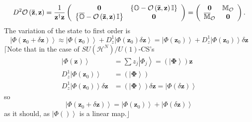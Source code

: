 \documentclass[aps,preprint]{revtex4}%
\begin{document}
\begin{equation}
D^{2}\mathcal{O}\left(  \mathbf{\bar{z},z}\right)  =\frac{1}{\mathbf{z}%
^{\dagger}\mathbf{z}}\left(
\begin{array}
[c]{cc}%
\mathbf{0} & \left\{  \mathbb{O}-\mathcal{O}\left(  \mathbf{\bar{z},z}\right)
\mathbb{I}\right\} \\
\left\{  \overline{\mathbb{O}}-\mathcal{O}\left(  \mathbf{\bar{z},z}\right)
\mathbb{I}\right\}  & \mathbf{0}%
\end{array}
\right)  =\left(
\begin{array}
[c]{cc}%
\mathbf{0} & \mathbb{M}_{\mathcal{O}}\\
\overline{\mathbb{M}}_{\mathcal{O}} & \mathbf{0}%
\end{array}
\right)  .
\end{equation}
The variation of the state to first order is
\begin{equation}
\left\vert \Phi\left(  \mathbf{z}_{0}+\delta\mathbf{z}\right)  \right\rangle
\approx\left\vert \Phi\left(  \mathbf{z}_{0}\right)  \right\rangle +D_{z}%
^{1}\left\vert \Phi\left(  \mathbf{z}_{0}\right)  \delta\mathbf{z}%
\right\rangle =\left\vert \Phi\left(  \mathbf{z}_{0}\right)  \right\rangle
+D_{z}^{1}\left\vert \Phi\left(  \mathbf{z}_{0}\right)  \right\rangle
\delta\mathbf{z}%
\end{equation}
$\lceil$Note that in the case of $SU\left(  \mathcal{H}^{N}\right)  /U\left(
1\right)  $-CS's
\begin{align}
\left\vert \Phi\left(  \mathbf{z}\right)  \right\rangle  &  =\sum
z_{j}\left\vert \Phi_{j}\right\rangle =\left(  \left\vert \mathbf{\Phi
}\right\rangle \right)  \mathbf{z}\nonumber\\
D_{z}^{1}\left\vert \Phi\left(  \mathbf{z}_{0}\right)  \right\rangle  &
=\left(  \left\vert \mathbf{\Phi}\right\rangle \right) \nonumber\\
D_{z}^{1}\left\vert \Phi\left(  \mathbf{z}_{0}\right)  \right\rangle
\delta\mathbf{z}  &  \mathbf{=}\left(  \left\vert \mathbf{\Phi}\right\rangle
\right)  \delta\mathbf{z}=\left\vert \Phi\left(  \delta\mathbf{z}\right)
\right\rangle
\end{align}
so
\begin{equation}
\left\vert \Phi\left(  \mathbf{z}_{0}+\delta\mathbf{z}\right)  \right\rangle
=\left\vert \Phi\left(  \mathbf{z}_{0}\right)  \right\rangle +\left\vert
\Phi\left(  \delta\mathbf{z}\right)  \right\rangle
\end{equation}
as it should, as $\left\vert \Phi\left(  {}\right)  \right\rangle $ is a
linear map.$\rfloor$
\end{document}
